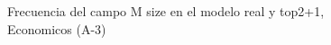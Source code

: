 \begin{figure}[H]
    \centering
    
    \caption{Frecuencia del campo M size en el modelo real y top2+1, Economicos (A-3)}
    \label{frecuency-M Size-top2+1}
\end{figure}